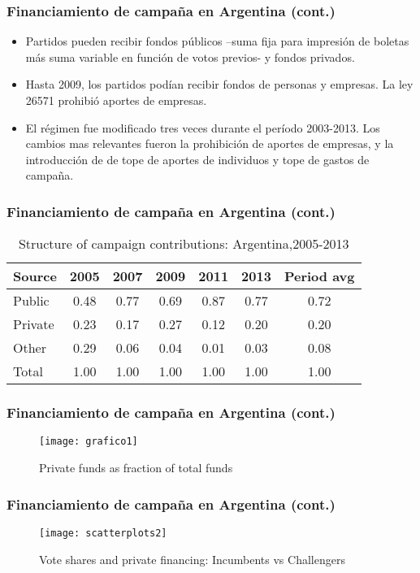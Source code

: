 \documentclass[handout,final,xcolor=dvipsnames]{beamer}
\begin{document}
\begin{frame}\frametitle{Financiamiento de campaña en Argentina (cont.)}
\begin{itemize}\itemsep 15pt
\item Partidos pueden recibir fondos públicos --suma fija para
  impresión de boletas más suma variable en función de votos previos-
  y fondos privados.
\item Hasta 2009, los partidos podían recibir fondos de
  personas y empresas. La ley 26571 prohibió aportes de empresas.
\item El régimen fue modificado tres veces
  durante el período 2003-2013. Los cambios mas relevantes fueron la
  prohibición de aportes de empresas, y la introducción de de tope de
  aportes de individuos y tope de gastos de campaña.
\end{itemize}
\end{frame}

\begin{frame}\frametitle{Financiamiento de campaña en Argentina (cont.)}
\begin{table}\centering\caption{Structure of campaign contributions:
    Argentina,2005-2013} \label{tab:struc1}
\begin{tabular}[htbp]{lcccccc}
  Source & 2005 & 2007 & 2009 & 2011 & 2013 & Period avg \\ \hline\hline
Public & 0.48 & 0.77 & 0.69 & 0.87 & 0.77 & 0.72 \\
Private & 0.23 & 0.17 & 0.27 & 0.12 & 0.20 &  0.20 \\
Other & 0.29 & 0.06 & 0.04 & 0.01 & 0.03 & 0.08 \\ \hline
Total & 1.00 & 1.00 & 1.00 & 1.00 & 1.00 & 1.00 \\
\end{tabular}
\end{table}
\end{frame}

\begin{frame}\frametitle{Financiamiento de campaña en Argentina (cont.)}
\begin{figure}[htbp]
  \centering
  \texttt{[image: grafico1]}
  \caption{Private funds as fraction of total funds}
  \label{fig:fig1}
\end{figure}
\end{frame}


\begin{frame}\frametitle{Financiamiento de campaña en Argentina (cont.)}
\begin{figure}[htbp]
  \centering
  \texttt{[image: scatterplots2]}
  \caption{Vote shares and private financing: Incumbents vs Challengers}
  \label{fig:scatterplots2}
\end{figure}
\end{frame}
\end{document}
